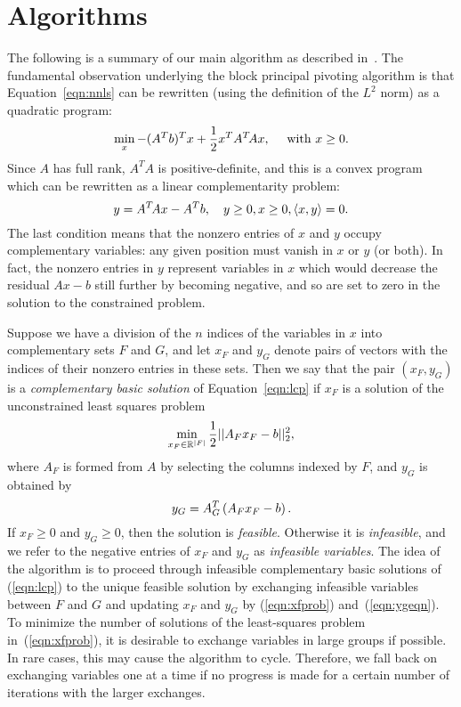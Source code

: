 \documentclass[acmtoms,acmnow,aps,floatfix]{acmtrans2m}
\def\marginpar#1{}   %
\let\lbl=\label
\def\label#1{\lbl{#1}\ifinner\else\marginpar{\ref{#1} #1}\ignorespaces\fi}
\begin{document}
\section{Algorithms}
\label{sec:algorithms}

The following is a summary of our main algorithm as described in~\cite{MR95a:90059}. The fundamental observation underlying the block principal pivoting algorithm is that Equation~\ref{eqn:nnls} can be rewritten (using the definition of the $L^2$ norm) as a quadratic program:
\begin{equation}
\label{eqn:cqpr}
\min_x \mathord{-}(A^T b)^T x + \frac{1}{2} x^T A^T\!A x , \quad  \mbox{ with } x \geq 0.
\end{equation}
Since $A$ has full rank, $A^T\!A$ is positive-definite, and this is a convex program
which can be rewritten as a linear complementarity problem:
\begin{equation}
\label{eqn:lcp}
y = A^T\! A x - A^T b, \quad y \geq 0, x \geq 0, \left< x, y \right> = 0.
\end{equation}
The last condition means that the nonzero entries of $x$ and $y$ occupy complementary
variables: any given position must vanish in $x$ or $y$ (or both). In fact, the nonzero entries in $y$ represent variables in $x$ which would decrease the residual $Ax - b$ still further by becoming negative, and so are set to zero in the solution to the constrained problem. 

Suppose we have a division of the $n$ indices of the variables in $x$ into complementary sets $F$ and $G$, and let $x_F$ and $y_G$ denote pairs of vectors with the indices of their nonzero entries in these sets. Then we say that the pair $(x_F, y_G)$ is a \emph{complementary basic solution} of Equation~\ref{eqn:lcp} if $x_F$ is a solution of the unconstrained least squares problem
\begin{equation}
\label{eqn:xfprob}
\min_{x_F \in \mathbb{R}^{|F|}} \frac{1}{2} || A_F x_F - b||_2^2,
\end{equation}
where $A_F$ is formed from $A$ by selecting the columns indexed by $F$, and $y_G$ is obtained by
\begin{equation}
\label{eqn:ygeqn}
y_G = A_G^T \left( A_F x_F - b \right).
\end{equation}
If $x_F \geq 0$ and $y_G \geq 0$, then the solution is \emph{feasible}. Otherwise it is
\emph{infeasible}, and we refer to the negative entries of $x_F$ and $y_G$ as \emph{infeasible variables}. The idea of the algorithm is to proceed through infeasible complementary basic solutions of (\ref{eqn:lcp}) to the unique feasible solution by exchanging infeasible variables between $F$ and $G$ and updating $x_F$ and $y_G$ by (\ref{eqn:xfprob}) and~(\ref{eqn:ygeqn}). To minimize the number of solutions of the least-squares problem in~(\ref{eqn:xfprob}), it is desirable to exchange variables in large groups if possible. In rare cases, this may cause the algorithm to cycle. Therefore, we fall back on exchanging variables one at a time if no progress is made for a certain number of iterations with the larger exchanges.
\end{document}

